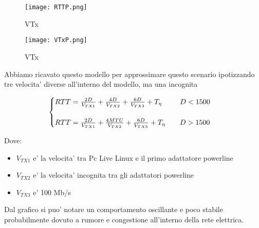 \documentclass[../lab2.tex]{subfiles}
\begin{document}
    
    \begin{figure}[!htb]
        \begin{minipage}{0.48\textwidth}
            \centering
            \texttt{[image: RTTP.png]}
            \vspace{-20pt}
            \caption{VTx}\label{RTTP}
        \end{minipage}\hfill
        \begin{minipage}{0.48\textwidth}
            \centering
            \texttt{[image: VTxP.png]}
            \vspace{-20pt}
            \caption{VTx}\label{VTxP}
        \end{minipage}
    \end{figure}

    Abbiamo ricavato questo modello per approssimare questo scenario ipotizzando 
    tre velocita' diverse all'interno del modello, ma una incognita

    \begin{equation}
        \centering
        \begin{cases}
            RTT = \frac{2D}{V_{TX1}} +\frac{4D}{V_{TX2}} +\frac{6D}{V_{TX3}} + T_\eta  \qquad \, \, \, D < 1500 \\
            \\
            RTT = \frac{2D}{V_{TX1}} +\frac{4MTU}{V_{TX2}} +\frac{6D}{V_{TX3}} + T_\eta  \qquad D > 1500
        \end{cases}
    \end{equation}

    Dove:

    \begin{itemize}
        \item $V_{TX1}$ e' la velocita' tra Pc Live Linux e il primo adattatore powerline \\
        \item $V_{TX2}$ e' la velocita' incognita tra gli adattatori powerline \\ 
        \item $V_{TX3}$ e' 100 Mb/s
    \end{itemize}

    Dal grafico si puo' notare un comportamento oscillante e poco stabile probabilmente
    dovuto a rumore e congestione all'interno della rete elettrica.
\end{document}
